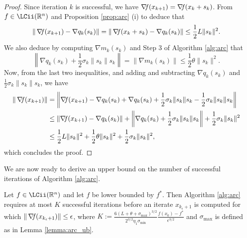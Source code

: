\documentclass[10pt,a4paper]{article}
\begin{document}
\begin{proof}
Since iteration $k$ is successful, we have $\operatorname*{\mathit{\nabla \!f}}(x_{k+1}) = \operatorname*{\mathit{\nabla \!f}}(x_k + s_k)$. From $f\in \LCii(\Rn)$ and Proposition \ref{prop:arc} (i) to deduce that
\begin{equation*}
	\|\operatorname*{\mathit{\nabla \!f}}(x_{k+1}) - \nabla q_k(s_k)\| = \|\operatorname*{\mathit{\nabla \!f}}(x_k + s_k) - \nabla q_k(s_k)\| \leq \frac{1}{2}L\|s_k\|^2.
\end{equation*}	
We also deduce by computing $\nabla m_k(s_k)$ and Step 3 of Algorithm \ref{alg:arc} that
\begin{equation*}
	\left \|\nabla q_k(s_k) + \frac{1}{2}\sigma_k \|s_k\| s_k \right\|=\|\nabla m_k(s_k)\| \leq \frac{1}{2}\theta \|s_k\|^2.
\end{equation*}
Now, from the last two inequalities, and adding and subtracting $\nabla q_k(s_k)$ and $\frac{1}{2}\sigma_k \|s_k\| s_k$, we have 
\begin{align*}
	\|\operatorname*{\mathit{\nabla \!f}}(x_{k+1})\| &= \left\|\operatorname*{\mathit{\nabla \!f}}(x_{k+1}) - \nabla q_k(s_k) + \nabla q_k(s_k) + \frac{1}{2}\sigma_k \|s_k\| s_k - \frac{1}{2}\sigma_k \|s_k\| s_k \right\|\\
	&\leq \left \|\operatorname*{\mathit{\nabla \!f}}(x_{k+1}) - \nabla q_k(s_k) \right \|  + \left\|\nabla q_k(s_k) + \frac{1}{2}\sigma_k \|s_k\| s_k \right \| + \frac{1}{2}\sigma_k \|s_k\|^2\\
	&\leq \frac{1}{2}L\|s_k\|^2 + \frac{1}{2}\theta \|s_k\|^2+ \frac{1}{2}\sigma_k \|s_k\|^2,
\end{align*} 
which concludes the proof.
\end{proof}
\pagebreak 
\noindent We are now ready to derive an upper bound on the number of successful iterations of Algorithm \ref{alg:arc}.

\begin{lemma}
	Let $f\in \LCii(\Rn)$ and let $f$ be lower bounded by $f^*$. Then Algorithm \ref{alg:arc} requires at most $K$ successful iterations before an iterate $x_{k_\epsilon+1}$ is computed for which $\|\operatorname*{\mathit{\nabla \!f}}(x_{k_\epsilon+1})\| \leq \epsilon$, where $K:= \frac{6(L + \theta + \sigma_{\max})^{3/2}}{2^{3/2} \eta_1 \sigma_{\min}} \frac{f(x_0) - f^*}{\epsilon^{3/2}}$ and $\sigma_{\max}$ is defined as in Lemma \ref{lemma:arc_ub}.
\end{lemma}
\end{document}
